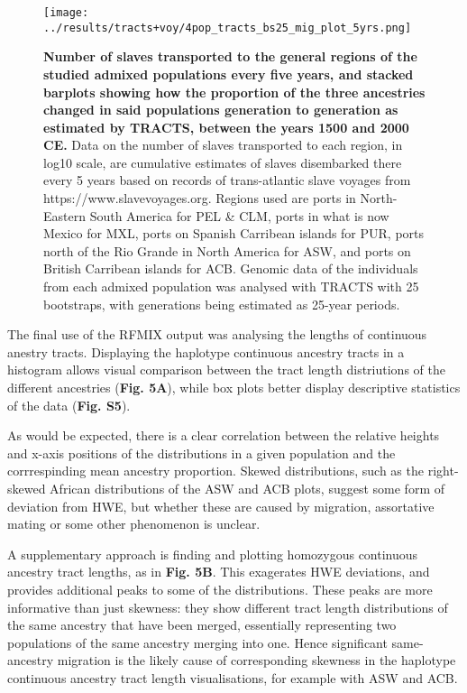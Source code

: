 \documentclass[11pt]{article}
\begin{document}
\begin{figure}[hbt!]%
    \centering
    \texttt{[image: 
        ../results/tracts+voy/4pop\_tracts\_bs25\_mig\_plot\_5yrs.png]}
    \vspace{-.2cm}
    \caption{\textbf{
        Number of slaves transported to the general regions of the studied admixed populations every five years, and stacked barplots showing how the proportion of the three ancestries changed in said populations generation to generation as estimated by TRACTS, between the years 1500 and 2000 CE.
    }
        Data on the number of slaves transported to each region, in log10 scale, are cumulative estimates of slaves disembarked there every 5 years based on records of trans-atlantic slave voyages from https://www.slavevoyages.org. Regions used are ports in North-Eastern South America for PEL \& CLM, ports in what is now Mexico for MXL, ports on Spanish Carribean islands for PUR, ports north of the Rio Grande in North America for ASW, and ports on British Carribean islands for ACB. Genomic data of the individuals from each admixed population was analysed with TRACTS with 25 bootstraps, with generations being estimated as 25-year periods.
    }
\end{figure}





The final use of the RFMIX output was analysing the lengths of continuous anestry tracts. Displaying the haplotype continuous ancestry tracts in a histogram allows visual comparison between the tract length distriutions of the different ancestries (\textbf{Fig. 5A}), while box plots better display descriptive statistics of the data (\textbf{Fig. S5}).

As would be expected, there is a clear correlation between the relative heights and x-axis positions of the distributions in a given population and the corrrespinding mean ancestry proportion. Skewed distributions, such as the right-skewed African distributions of the ASW and ACB plots, suggest some form of deviation from HWE, but whether these are caused by migration, assortative mating or some other phenomenon is unclear.

A supplementary approach is finding and plotting homozygous continuous ancestry tract lengths, as in \textbf{Fig. 5B}. This exagerates HWE deviations, and provides additional peaks to some of the distributions. These peaks are more informative than just skewness: they show different tract length distributions of the same ancestry that have been merged, essentially representing two populations of the same ancestry merging into one. Hence significant same-ancestry migration is the likely cause of corresponding skewness in the haplotype continuous ancestry tract length visualisations, for example with ASW and ACB.
\end{document}
